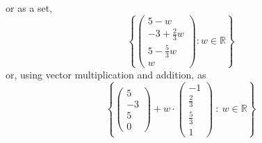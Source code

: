 \documentclass[11pt]{article}
\newcommand{\R}{{\mathbb R}}
\theoremstyle{definition}
\begin{document}
or as a set,
$$\left\{\begin{pmatrix} 5 - w\\ -3 + \frac{2}{3}w \\ 5 - \frac{5}{3}w \\ w \end{pmatrix} : w\in \R\right\}$$
or, using vector multiplication and addition, as
$$\left\{\begin{pmatrix} 5 \\ -3 \\ 5  \\ 0 \end{pmatrix}
            + w\cdot\begin{pmatrix} -1\\ \frac{2}{3} \\ \frac{5}{3} \\ 1 \end{pmatrix} \ :\  w\in \R\right\}$$
\end{document}
